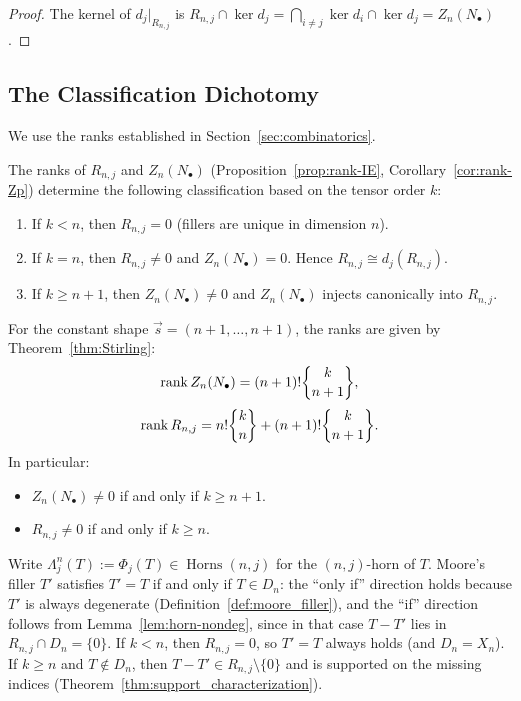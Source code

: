 \begin{proof}
The kernel of $d_j|_{R_{n,j}}$ is
$R_{n,j}\cap\ker d_j = \bigcap_{i\ne j}\ker d_i \cap \ker d_j = Z_n(N_\bullet)$.
\end{proof}

\subsection{The Classification Dichotomy}

We use the ranks established in Section~\ref{sec:combinatorics}.

\begin{corollary}\label{cor:dichotomy}
The ranks of $R_{n,j}$ and $Z_n(N_\bullet)$ (Proposition~\ref{prop:rank-IE}, Corollary~\ref{cor:rank-Zp}) determine the following classification based on the tensor order $k$:
\begin{enumerate}
\item If $k<n$, then $R_{n,j}=0$ (fillers are unique in dimension $n$).
\item If $k=n$, then $R_{n,j}\neq 0$ and $Z_n(N_\bullet)=0$. Hence $R_{n,j}\cong d_j(R_{n,j})$.
\item If $k\ge n+1$, then $Z_n(N_\bullet)\neq 0$ and $Z_n(N_\bullet)$ injects canonically into $R_{n,j}$.
\end{enumerate}
\end{corollary}

\begin{corollary}\label{cor:rank-constant-shape-revised}
For the constant shape $\vec{s} = (n+1, \ldots, n+1)$, the ranks are given by Theorem~\ref{thm:Stirling}:
\[
\rank Z_n(N_\bullet) = (n+1)! \StirlingII{k}{n+1},
\]
\[
\rank R_{n,j} = n! \StirlingII{k}{n} + (n+1)! \StirlingII{k}{n+1}.
\]
In particular:
\begin{itemize}
\item $Z_n(N_\bullet) \neq 0$ if and only if $k \geq n+1$.
\item $R_{n,j} \neq 0$ if and only if $k \geq n$.
\end{itemize}
\end{corollary}

\begin{remark}
Write $\Lambda^n_j(T):=\Phi_j(T)\in \operatorname{Horns}(n,j)$ for the $(n,j)$-horn of $T$.
Moore’s filler $T'$ satisfies $T'=T$ if and only if $T \in D_n$: the “only if” direction holds because $T'$ is always degenerate (Definition~\ref{def:moore_filler}), and the “if” direction follows from Lemma~\ref{lem:horn-nondeg}, since in that case $T-T'$ lies in $R_{n,j}\cap D_n=\{0\}$. If $k<n$, then $R_{n,j}=0$, so $T'=T$ always holds (and $D_n=X_n$). If $k\ge n$ and $T \notin D_n$, then $T-T'\in R_{n,j}\setminus\{0\}$ and is supported on the missing indices (Theorem~\ref{thm:support_characterization}).
\end{remark}

